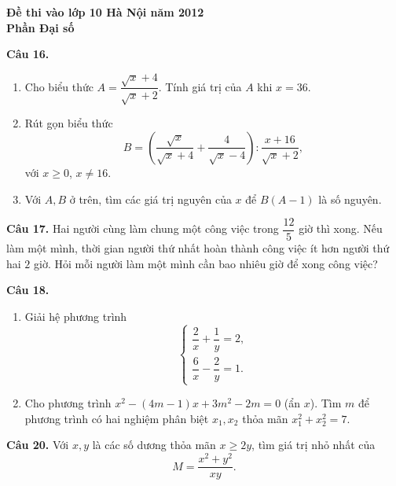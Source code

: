 \documentclass[12pt,a4paper]{article}
\begin{document}
\begin{center}\Large\bfseries Đề thi vào lớp 10 Hà Nội năm 2012\\Phần Đại số\end{center}

\textbf{Câu 16.}
\begin{enumerate}
\item[a)] Cho biểu thức $A=\dfrac{\sqrt{x}+4}{\sqrt{x}+2}$. Tính giá trị của $A$ khi $x=36$.
\item[b)] Rút gọn biểu thức
\[
B=\left(\frac{\sqrt{x}}{\sqrt{x}+4}+\frac{4}{\sqrt{x}-4}\right):\frac{x+16}{\sqrt{x}+2},
\]
với $x\ge0$, $x\ne16$.
\item[c)] Với $A,B$ ở trên, tìm các giá trị nguyên của $x$ để $B(A-1)$ là số nguyên.
\end{enumerate}

\textbf{Câu 17.} Hai người cùng làm chung một công việc trong $\dfrac{12}{5}$ giờ thì xong. Nếu làm một mình, thời gian người thứ nhất hoàn thành công việc ít hơn người thứ hai $2$ giờ. Hỏi mỗi người làm một mình cần bao nhiêu giờ để xong công việc?

\textbf{Câu 18.}
\begin{enumerate}
\item[a)] Giải hệ phương trình
\[
\begin{cases}
\dfrac2x+\dfrac1y=2,\\[2pt]
\dfrac6x-\dfrac2y=1.
\end{cases}
\]
\item[b)] Cho phương trình $x^2-(4m-1)x+3m^2-2m=0$ (ẩn $x$). Tìm $m$ để phương trình có hai nghiệm phân biệt $x_1,x_2$ thỏa mãn $x_1^2+x_2^2=7$.
\end{enumerate}

\textbf{Câu 20.} Với $x,y$ là các số dương thỏa mãn $x\ge2y$, tìm giá trị nhỏ nhất của
\[
M=\frac{x^2+y^2}{xy}.
\]
\end{document}
